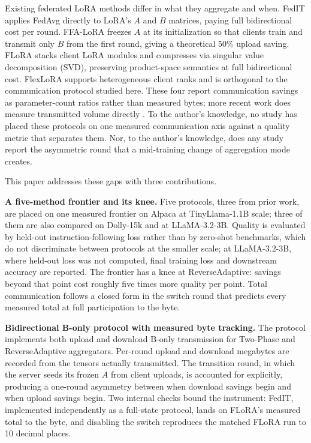 \documentclass[iicol,pdflatex,sn-mathphys-num]{sn-jnl}
\begin{document}
Existing federated LoRA methods differ in what they aggregate and when. FedIT \cite{zhang2024federatedgpt} applies FedAvg \cite{mcmahan2017communication} directly to LoRA's $A$ and $B$ matrices, paying full bidirectional cost per round. FFA-LoRA \cite{sun2024ffalora} freezes $A$ at its initialization so that clients train and transmit only $B$ from the first round, giving a theoretical 50\% upload saving. FLoRA \cite{wang2024flora} stacks client LoRA modules and compresses via singular value decomposition (SVD), preserving product-space semantics at full bidirectional cost. FlexLoRA \cite{bai2024flexlora} supports heterogeneous client ranks and is orthogonal to the communication protocol studied here. These four report communication savings as parameter-count ratios rather than measured bytes; more recent work does measure transmitted volume directly \cite{yan2026fedsrd,ramesh2026florist}. To the author's knowledge, no study has placed these protocols on one measured communication axis against a quality metric that separates them. Nor, to the author's knowledge, does any study report the asymmetric round that a mid-training change of aggregation mode creates.

This paper addresses these gaps with three contributions.

\textbf{A five-method frontier and its knee.}
Five protocols, three from prior work, are placed on one measured frontier on Alpaca at TinyLlama-1.1B scale; three of them are also compared on Dolly-15k and at LLaMA-3.2-3B. Quality is evaluated by held-out instruction-following loss rather than by zero-shot benchmarks, which do not discriminate between protocols at the smaller scale; at LLaMA-3.2-3B, where held-out loss was not computed, final training loss and downstream accuracy are reported. The frontier has a knee at ReverseAdaptive: savings beyond that point cost roughly five times more quality per point. Total communication follows a closed form in the switch round that predicts every measured total at full participation to the byte.

\textbf{Bidirectional B-only protocol with measured byte tracking.}
The protocol implements both upload and download B-only transmission for Two-Phase and ReverseAdaptive aggregators. Per-round upload and download megabytes are recorded from the tensors actually transmitted. The transition round, in which the server seeds its frozen $A$ from client uploads, is accounted for explicitly, producing a one-round asymmetry between when download savings begin and when upload savings begin. Two internal checks bound the instrument: FedIT, implemented independently as a full-state protocol, lands on FLoRA's measured total to the byte, and disabling the switch reproduces the matched FLoRA run to 10 decimal places.
\end{document}
